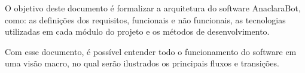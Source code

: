 \par O objetivo deste documento é formalizar a arquitetura do software AnaclaraBot, como: as definições dos requisitos, funcionais e não funcionais, as tecnologias utilizadas em cada módulo do projeto e os métodos de desenvolvimento.
\\
\par Com esse documento, é possível entender todo o funcionamento do software em uma visão macro, no qual serão ilustrados os principais fluxos e transições. 